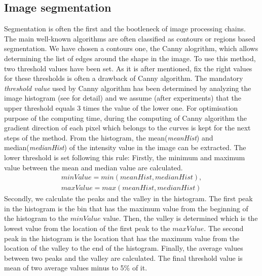 \documentclass[twoside,twocolumn,10pt]{article}
\begin{document}
\subsection{Image segmentation}
Segmentation is often the first and the bootleneck of image processing
chains. The main well-known algorithms are often classified as contours
or regions based segmentation. We have chosen a contours one, the
Canny alogrithm\cite{canny1986computational}, which allows determining the list of edges around the shape in the image. To use this method, two threshold values have been set. As it is after mentioned, fix the right values for these thresholds is often a drawback of Canny algorithm\cite{adaptiveCanny}. The mandatory \textit{threshold
  value} used by Canny algorithm has been determined by analyzing the image
histogram (see \cite{leestimating} for detail) and we assume (after experiments) that the
upper threshold equals 3 times the value of the lower one. For
optimisation purpose of the computing time, during the computing of Canny algorithm the gradient direction of each pixel which belongs to the
curves is kept for the next steps of the method. From the histogram, the mean(\textit{meanHist}) and median(\textit{medianHist}) of the intensity value in the image can be extracted. The lower threshold is set following this rule: Firstly, the minimum and maximum value between the mean and median value are calculated.
\begin{equation}
\begin{aligned}
	minValue = min(meanHist, medianHist), \\
	maxValue = max(meanHist, medianHist)
	\end{aligned}
\end{equation}
Secondly, we calculate the peaks and the valley in the histogram. The first peak in the histogram is the bin that has the maximum value from the beginning of the histogram to the \textit{$minValue$} value. Then, the valley is determined which is the lowest value from the location of the first peak to the \textit{$maxValue$}. The second peak in the histogram is the location that has the maximum value from the location of the valley to the end of the histogram. Finally, the average values between two peaks and the valley are calculated. The final threshold value is mean of two average values minus to 5\% of it.
\end{document}
